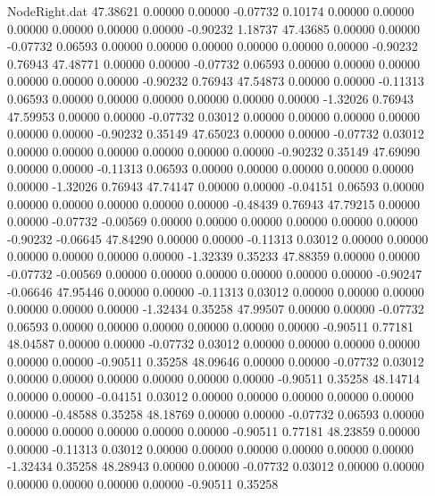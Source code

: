 \begin{filecontents}{NodeRight.dat}
  47.38621    0.00000    0.00000    -0.07732    0.10174    0.00000    0.00000    0.00000    0.00000    0.00000    0.00000   -0.90232    1.18737
  47.43685    0.00000    0.00000    -0.07732    0.06593    0.00000    0.00000    0.00000    0.00000    0.00000    0.00000   -0.90232    0.76943
  47.48771    0.00000    0.00000    -0.07732    0.06593    0.00000    0.00000    0.00000    0.00000    0.00000    0.00000   -0.90232    0.76943
  47.54873    0.00000    0.00000    -0.11313    0.06593    0.00000    0.00000    0.00000    0.00000    0.00000    0.00000   -1.32026    0.76943
  47.59953    0.00000    0.00000    -0.07732    0.03012    0.00000    0.00000    0.00000    0.00000    0.00000    0.00000   -0.90232    0.35149
  47.65023    0.00000    0.00000    -0.07732    0.03012    0.00000    0.00000    0.00000    0.00000    0.00000    0.00000   -0.90232    0.35149
  47.69090    0.00000    0.00000    -0.11313    0.06593    0.00000    0.00000    0.00000    0.00000    0.00000    0.00000   -1.32026    0.76943
  47.74147    0.00000    0.00000    -0.04151    0.06593    0.00000    0.00000    0.00000    0.00000    0.00000    0.00000   -0.48439    0.76943
  47.79215    0.00000    0.00000    -0.07732   -0.00569    0.00000    0.00000    0.00000    0.00000    0.00000    0.00000   -0.90232   -0.06645
  47.84290    0.00000    0.00000    -0.11313    0.03012    0.00000    0.00000    0.00000    0.00000    0.00000    0.00000   -1.32339    0.35233
  47.88359    0.00000    0.00000    -0.07732   -0.00569    0.00000    0.00000    0.00000    0.00000    0.00000    0.00000   -0.90247   -0.06646
  47.95446    0.00000    0.00000    -0.11313    0.03012    0.00000    0.00000    0.00000    0.00000    0.00000    0.00000   -1.32434    0.35258
  47.99507    0.00000    0.00000    -0.07732    0.06593    0.00000    0.00000    0.00000    0.00000    0.00000    0.00000   -0.90511    0.77181
  48.04587    0.00000    0.00000    -0.07732    0.03012    0.00000    0.00000    0.00000    0.00000    0.00000    0.00000   -0.90511    0.35258
  48.09646    0.00000    0.00000    -0.07732    0.03012    0.00000    0.00000    0.00000    0.00000    0.00000    0.00000   -0.90511    0.35258
  48.14714    0.00000    0.00000    -0.04151    0.03012    0.00000    0.00000    0.00000    0.00000    0.00000    0.00000   -0.48588    0.35258
  48.18769    0.00000    0.00000    -0.07732    0.06593    0.00000    0.00000    0.00000    0.00000    0.00000    0.00000   -0.90511    0.77181
  48.23859    0.00000    0.00000    -0.11313    0.03012    0.00000    0.00000    0.00000    0.00000    0.00000    0.00000   -1.32434    0.35258
  48.28943    0.00000    0.00000    -0.07732    0.03012    0.00000    0.00000    0.00000    0.00000    0.00000    0.00000   -0.90511    0.35258

\end{filecontents}
